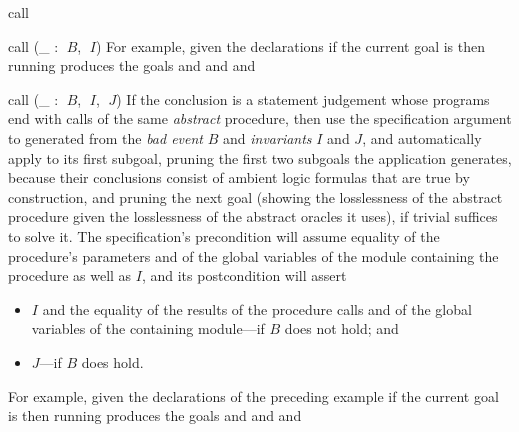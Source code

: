 \begin{tactic}{call}
\begin{tsyntax}{call (_ : $\;B$, $\;I$)}
    \medskip
    For example, given the declarations
    if the current goal is
    then running
    produces the goals
     and
     and
     and
  \end{tsyntax}

  \begin{tsyntax}{call (_ : $\;B$, $\;I$, $\;J$)}
    If the conclusion is a \prhl statement judgement whose programs
    end with calls of the same \emph{abstract} procedure, then use the
    specification argument to  generated from the \emph{bad
      event} $B$ and \emph{invariants} $I$ and $J$, and automatically
    apply  to its first subgoal, pruning
    the first two subgoals the application generates, because their
    conclusions consist of ambient logic formulas that are true by
    construction, and pruning the next goal (showing the losslessness
    of the abstract procedure given the losslessness of the abstract
    oracles it uses), if trivial suffices to solve it.  The
    specification's precondition will assume equality of the
    procedure's parameters and of the global variables of the module
    containing the procedure as well as $I$, and its postcondition
    will assert
    \begin{itemize}
    \item $I$ and the equality of the results of the procedure calls
      and of the global variables of the containing module---if $B$
      does not hold; and

    \item $J$---if $B$ does hold.
    \end{itemize}

    \medskip
    For example, given the declarations of the preceding example
    if the current goal is
    then running
    produces the goals
     and
     and
     and
  \end{tsyntax}
\end{tactic}
